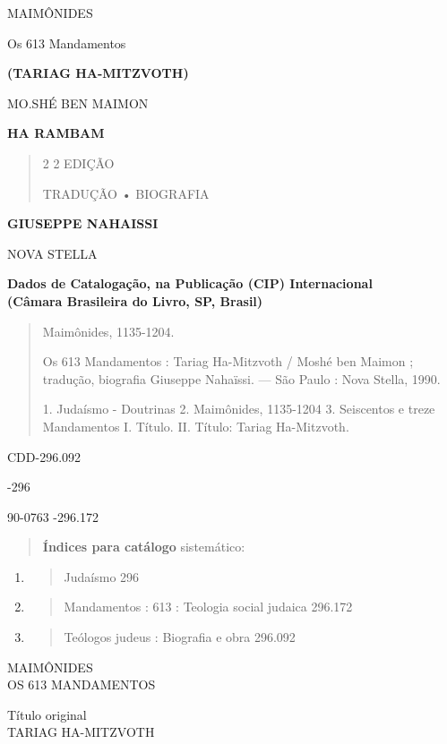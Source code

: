 MAIMÔNIDES

Os 613 Mandamentos


\textbf{(TARIAG HA-MITZVOTH)}

MO.SHÉ BEN MAIMON

\textbf{HA RAMBAM}

\begin{quote}
2 2 EDIÇÃO

TRADUÇÃO • BIOGRAFIA
\end{quote}

\textbf{GIUSEPPE NAHAISSI}

NOVA STELLA

\textbf{Dados de Catalogação, na Publicação (CIP) Internacional\\
(Câmara Brasileira do Livro, SP, Brasil)}

\begin{quote}
Maimônides, 1135-1204.

Os 613 Mandamentos : Tariag Ha-Mitzvoth / Moshé ben Maimon ; tradução,
biografia Giuseppe Nahaïssi. --- São Paulo : Nova Stella, 1990.

1. Judaísmo - Doutrinas 2. Maimônides, 1135-1204 3. Seiscentos e treze
Mandamentos I. Título. II. Título: Tariag Ha-Mitzvoth.
\end{quote}

CDD-296.092

-296

90-0763 -296.172

\begin{quote}
\textbf{Índices para catálogo} sistemático:
\end{quote}

\begin{enumerate}
\def\labelenumi{\arabic{enumi}.}
\item
 \begin{quote}
 Judaísmo 296
 \end{quote}
\item
 \begin{quote}
 Mandamentos : 613 : Teologia social judaica 296.172
 \end{quote}
\item
 \begin{quote}
 Teólogos judeus : Biografia e obra 296.092
 \end{quote}
\end{enumerate}

MAIMÔNIDES\\
OS 613 MANDAMENTOS

Título original\\
TARIAG HA-MITZVOTH

